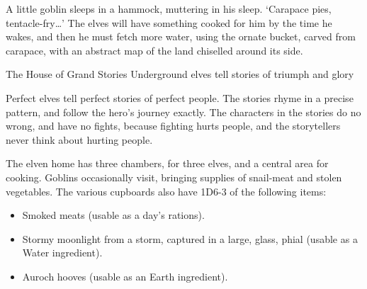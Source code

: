 A little goblin sleeps in a hammock, muttering in his sleep.
`Carapace pies, tentacle-fry\ldots'
The elves will have something cooked for him by the time he wakes, and then he must fetch more water, using the ornate bucket, carved from carapace, with an abstract map of the land chiselled around its side.


{The House of Grand Stories}%
{Underground elves tell stories of triumph and glory}%

Perfect elves tell perfect stories of perfect people.
The stories rhyme in a precise pattern, and follow the hero's journey exactly.
The characters in the stories do no wrong, and have no fights, because fighting hurts people, and the storytellers never think about hurting people.

The elven home has three chambers, for three elves, and a central area for cooking.
Goblins occasionally visit, bringing supplies of snail-meat and stolen vegetables.
The various cupboards also have 1D6-3 of the following items:

\begin{itemize}
  \item
  Smoked meats (usable as a day's rations).
  \item
  Stormy moonlight from a storm, captured in a large, glass, phial (usable as a Water \gls{ingredient}).
  \item
  Auroch hooves (usable as an Earth \gls{ingredient}).
\end{itemize}

